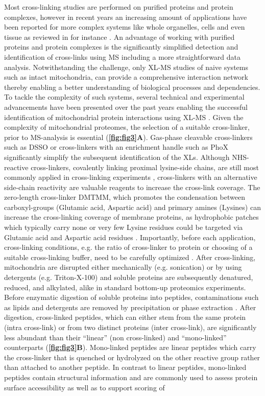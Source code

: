Most cross-linking studies are performed on purified proteins and protein complexes, however in recent years an increasing amount of applications have been reported for more complex systems like whole organelles, cells and even tissue as reviewed in for instance \cite{O'Reilly_2018}. An advantage of working with purified proteins and protein complexes is the significantly simplified detection and identification of cross-links using MS including a more straightforward data analysis. Notwithstanding the challenge, only XL-MS studies of naive systems such as intact mitochondria, can provide a comprehensive interaction network thereby enabling a better understanding of biological processes and dependencies. To tackle the complexity of such systems, several technical and experimental advancements have been presented over the past years enabling the successful identification of mitochondrial protein interactions using XL-MS \cite{Liu_2018, Ryl_2020, Schweppe_2017}.  Given the complexity of mitochondrial proteomes, the selection of a suitable cross-linker, prior to MS-analysis is essential (\textbf{\autoref{fig:fig3}A}). Gas-phase cleavable cross-linkers such as DSSO \cite{Kao_2011} or cross-linkers with an enrichment handle such as PhoX \cite{Steigenberger_2019} significantly simplify the subsequent identification of the XLs. Although NHS- reactive cross-linkers, covalently linking proximal lysine-side chains, are still most commonly applied in cross-linking experiments \cite{Steigenberger_2020}, cross-linkers with an alternative side-chain reactivity are valuable reagents to increase the cross-link coverage. The zero-length cross-linker DMTMM, which promotes the condensation between carboxyl-groups (Glutamic acid, Aspartic acid) and primary amines (Lysines) can increase the cross-linking coverage of membrane proteins, as hydrophobic patches which typically carry none or very few Lysine residues could be targeted via Glutamic acid and Aspartic acid residues \cite{Hevler_2021b}. Importantly, before each application, cross-linking conditions, e.g. the ratio of cross-linker to protein or choosing of a suitable cross-linking buffer, need to be carefully optimized \cite{O'Reilly_2018}. After cross-linking, mitochondria are disrupted either mechanically (e.g. sonication) or by using detergents (e.g. Triton-X-100) and soluble proteins are subsequently denatured, reduced, and alkylated, alike in standard bottom-up proteomics experiments. Before enzymatic digestion of soluble proteins into peptides, contaminations such as lipids and detergents are removed by precipitation or phase extraction \cite{Klykov_2018}. After digestion, cross-linked peptides, which can either stem from the same protein (intra cross-link) or from two distinct proteins (inter cross-link), are significantly less abundant than their “linear” (non cross-linked) and “mono-linked” counterparts \cite{Leitner_2014, Leitner_2010, Sinnott_2020} (\textbf{\autoref{fig:fig3}B}). Mono-linked peptides are linear peptides which carry the cross-linker that is quenched or hydrolyzed on the other reactive group rather than attached to another peptide. In contrast to linear peptides, mono-linked peptides contain structural information and are commonly used to assess protein surface accessibility as well as to support scoring of 